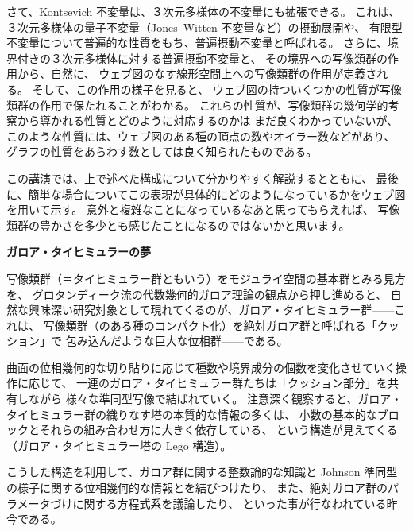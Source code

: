\documentclass[uplatex,dvipdfmx]{jlreq}
\begin{document}
さて、Kontsevich 不変量は、３次元多様体の不変量にも拡張できる。
これは、３次元多様体の量子不変量（Jones--Witten 不変量など）の摂動展開や、
有限型不変量について普遍的な性質をもち、普遍摂動不変量と呼ばれる。
さらに、境界付きの３次元多様体に対する普遍摂動不変量と、
その境界への写像類群の作用から、自然に、
ウェブ図のなす線形空間上への写像類群の作用が定義される。
そして、この作用の様子を見ると、
ウェブ図の持ついくつかの性質が写像類群の作用で保たれることがわかる。
これらの性質が、写像類群の幾何学的考察から導かれる性質とどのように対応するのかは
まだ良くわかっていないが、
このような性質には、ウェブ図のある種の頂点の数やオイラー数などがあり、
グラフの性質をあらわす数としては良く知られたものである。

この講演では、上で述べた構成について分かりやすく解説するとともに、
最後に、簡単な場合についてこの表現が具体的にどのようになっているかをウェブ図を用いて示す。
意外と複雑なことになっているなあと思ってもらえれば、
写像類群の豊かさを多少とも感じたことになるのではないかと思います。

\newpage

\begin{center}
{\large\bfseries ガロア・タイヒミュラーの夢}

\hspace*{\fill}{\large\bfseries 中村 博昭（都立大・理）}
\end{center}

\medskip

写像類群（＝タイヒミュラー群ともいう）をモジュライ空間の基本群とみる見方を、
グロタンディーク流の代数幾何的ガロア理論の観点から押し進めると、
自然な興味深い研究対象として現れてくるのが、ガロア・タイヒミュラー群——これは、
写像類群（のある種のコンパクト化）を絶対ガロア群と呼ばれる「クッション」で
包み込んだような巨大な位相群——である。

曲面の位相幾何的な切り貼りに応じて種数や境界成分の個数を変化させていく操作に応じて、
一連のガロア・タイヒミュラー群たちは「クッション部分」を共有しながら
様々な準同型写像で結ばれていく。
注意深く観察すると、ガロア・タイヒミュラー群の織りなす塔の本質的な情報の多くは、
小数の基本的なブロックとそれらの組み合わせ方に大きく依存している、
という構造が見えてくる（ガロア・タイヒミュラー塔の Lego 構造）。

こうした構造を利用して、ガロア群に関する整数論的な知識と
Johnson 準同型の様子に関する位相幾何的な情報とを結びつけたり、
また、絶対ガロア群のパラメータづけに関する方程式系を議論したり、
といった事が行なわれている昨今である。
\end{document}
